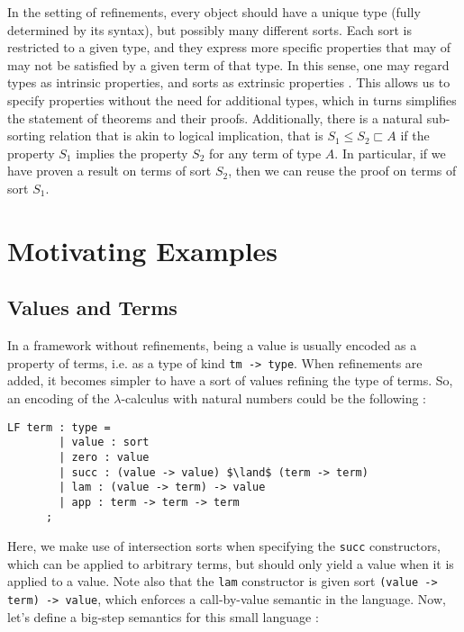 \documentclass[letterpaper, 11pt]{article}
\begin{document}
    In the setting of refinements, every object should have a unique type (fully determined by its syntax), but possibly many different sorts.  Each 
    sort is restricted to a given type, and they express more specific properties that may of may not be satisfied by a given term of that type.  In 
    this sense, one may regard types as intrinsic properties, and sorts as extrinsic properties \cite{Pfenning2000}.  This allows us to specify properties
    without the need for additional types, which in turns simplifies the statement of theorems and their proofs.  Additionally, there is a natural 
    sub-sorting relation that is akin to logical implication, that is $S_1 \leq S_2 \sqsubset A$ if the property $S_1$ implies the property $S_2$ for
    any term of type $A$.  In particular, if we have proven a result on terms of sort $S_2$, then we can reuse the proof on terms of sort $S_1$.

    \section{Motivating Examples}

    \subsection{Values and Terms}
    
    In a framework without refinements, being a value is usually encoded as a property of terms, i.e. as a type of kind \texttt{tm -> type}.  When
    refinements are added, it becomes simpler to have a sort of values refining the type of terms.  So, an encoding of the $\lambda$-calculus with
    natural numbers could be the following :

    \begin{lstlisting}[mathescape, basicstyle=\fontfamily{lmvtt}\selectfont]
      LF term : type =
        | value : sort
        | zero : value
        | succ : (value -> value) $\land$ (term -> term)
        | lam : (value -> term) -> value
        | app : term -> term -> term
      ;
    \end{lstlisting}

    Here, we make use of intersection sorts when specifying the \texttt{succ} constructors, which can be applied to arbitrary terms, but should only 
    yield a value when it is applied to a value. Note also that the \texttt{lam} constructor is given sort \texttt{(value -> term) -> value}, which 
    enforces a call-by-value semantic in the language.  Now, let's define a big-step semantics for this small language :
\end{document}
